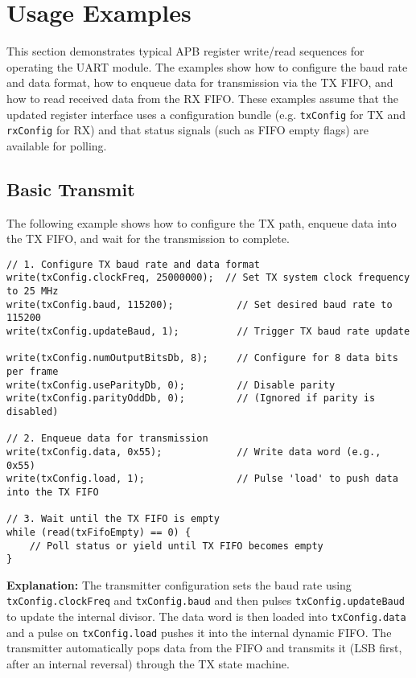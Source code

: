 \section{Usage Examples}

This section demonstrates typical APB register write/read sequences for operating the UART module. The examples show how to configure the baud rate and data format, how to enqueue data for transmission via the TX FIFO, and how to read received data from the RX FIFO. These examples assume that the updated register interface uses a configuration bundle (e.g. \texttt{txConfig} for TX and \texttt{rxConfig} for RX) and that status signals (such as FIFO empty flags) are available for polling.

\subsection{Basic Transmit}

The following example shows how to configure the TX path, enqueue data into the TX FIFO, and wait for the transmission to complete.

\begin{verbatim}
// 1. Configure TX baud rate and data format
write(txConfig.clockFreq, 25000000);  // Set TX system clock frequency to 25 MHz
write(txConfig.baud, 115200);           // Set desired baud rate to 115200
write(txConfig.updateBaud, 1);          // Trigger TX baud rate update

write(txConfig.numOutputBitsDb, 8);     // Configure for 8 data bits per frame
write(txConfig.useParityDb, 0);         // Disable parity
write(txConfig.parityOddDb, 0);         // (Ignored if parity is disabled)

// 2. Enqueue data for transmission
write(txConfig.data, 0x55);             // Write data word (e.g., 0x55)
write(txConfig.load, 1);                // Pulse 'load' to push data into the TX FIFO

// 3. Wait until the TX FIFO is empty
while (read(txFifoEmpty) == 0) {
    // Poll status or yield until TX FIFO becomes empty
}
\end{verbatim}

\vspace{1em}
\noindent
\textbf{Explanation:}  
The transmitter configuration sets the baud rate using \texttt{txConfig.clockFreq} and \texttt{txConfig.baud} and then pulses \texttt{txConfig.updateBaud} to update the internal divisor. The data word is then loaded into \texttt{txConfig.data} and a pulse on \texttt{txConfig.load} pushes it into the internal dynamic FIFO. The transmitter automatically pops data from the FIFO and transmits it (LSB first, after an internal reversal) through the TX state machine.


